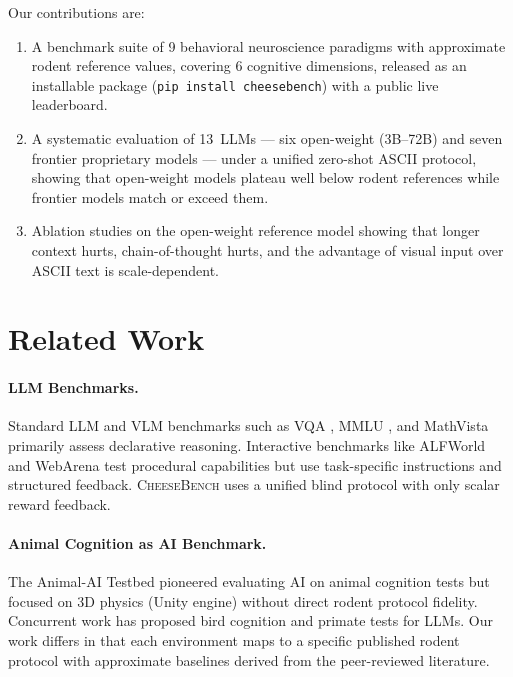 \documentclass[letterpaper]{article}
\begin{document}
Our contributions are:
\begin{enumerate}
    \item A benchmark suite of 9 behavioral neuroscience paradigms with approximate rodent reference values, covering 6 cognitive dimensions, released as an installable package (\texttt{pip install cheesebench}) with a public live leaderboard.
    \item A systematic evaluation of 13~LLMs --- six open-weight (3B--72B) and seven frontier proprietary models --- under a unified zero-shot ASCII protocol, showing that open-weight models plateau well below rodent references while frontier models match or exceed them.
    \item Ablation studies on the open-weight reference model showing that longer context hurts, chain-of-thought hurts, and the advantage of visual input over ASCII text is scale-dependent.
\end{enumerate}


\section{Related Work}

\paragraph{LLM Benchmarks.}
Standard LLM and VLM benchmarks such as VQA \citep{antol2015vqa}, MMLU \citep{hendrycks2021measuring}, and MathVista \citep{lu2024mathvista} primarily assess declarative reasoning.
Interactive benchmarks like ALFWorld \citep{shridhar2021alfworld} and WebArena \citep{zhou2024webarena} test procedural capabilities but use task-specific instructions and structured feedback.
\textsc{CheeseBench} uses a unified blind protocol with only scalar reward feedback.

\paragraph{Animal Cognition as AI Benchmark.}
The Animal-AI Testbed \citep{crosby2020animal} pioneered evaluating AI on animal cognition tests but focused on 3D physics (Unity engine) without direct rodent protocol fidelity.
Concurrent work has proposed bird cognition \citep{voudouris2023direct} and primate tests for LLMs.
Our work differs in that each environment maps to a specific published rodent protocol with approximate baselines derived from the peer-reviewed literature.
\end{document}

